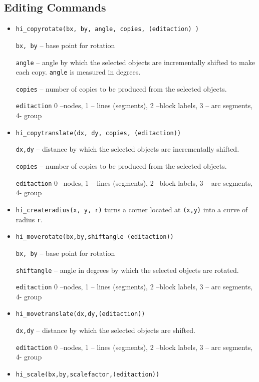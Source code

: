 \subsection{Editing Commands}
\begin{itemize}

\item \texttt{hi\_copyrotate(bx, by, angle, copies, (editaction) )}

\texttt{bx, by} -- base point for rotation

\texttt{angle} -- angle by which the selected objects are incrementally
shifted to make each copy. \texttt{angle} is measured in degrees.

\texttt{copies} -- number of copies to be produced from the selected
objects.

\texttt{editaction} 0 --nodes, 1 -- lines (segments), 2 --block labels, 3 --
arc segments, 4- group

\item \texttt{hi\_copytranslate(dx, dy, copies, (editaction))}

\texttt{dx,dy} -- distance by which the selected objects are incrementally
shifted.

\texttt{copies} -- number of copies to be produced from the selected
objects.

\texttt{editaction} 0 --nodes, 1 -- lines (segments), 2 --block labels, 3 --
arc segments, 4- group

\item{\tt hi\_createradius(x, y, r)} turns a corner located at {\tt (x,y)} into a curve of radius {\tt r}.

\item \texttt{hi\_moverotate(bx,by,shiftangle (editaction))}

\texttt{bx, by} -- base point for rotation

\texttt{shiftangle} -- angle in degrees by which the selected objects are
rotated.

\texttt{editaction} 0 --nodes, 1 -- lines (segments), 2 --block labels, 3 --
arc segments, 4- group

\item \texttt{hi\_movetranslate(dx,dy,(editaction))}

\texttt{dx,dy} -- distance by which the selected objects are shifted.

\texttt{editaction} 0 --nodes, 1 -- lines (segments), 2 --block labels, 3 --
arc segments, 4- group

\item \texttt{hi\_scale(bx,by,scalefactor,(editaction))}


\end{itemize}

